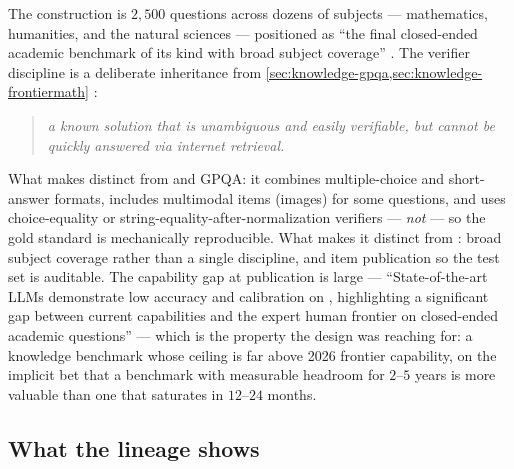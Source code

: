 The construction is $2{,}500$ questions across dozens of subjects ---
mathematics, humanities, and the natural sciences ---
positioned as ``the final closed-ended academic benchmark of its kind
with broad subject coverage'' \citep[\S{}abstract]{phan2025-hle}. The
verifier discipline is a deliberate inheritance from
\cref{sec:knowledge-gpqa,sec:knowledge-frontiermath}
\citep[\S{}sec-format]{phan2025-hle}:

\begin{quote}\itshape
a known solution that is unambiguous and easily verifiable, but cannot
be quickly answered via internet retrieval.
\end{quote}

What makes  distinct from  and GPQA: it combines multiple-choice
and short-answer formats, includes multimodal items (images) for some
questions, and uses choice-equality or string-equality-after-normalization
verifiers --- \emph{not}  --- so the gold standard is
mechanically reproducible. What makes it distinct from :
broad subject coverage rather than a single discipline, and item
publication so the test set is auditable. The capability gap at
publication is large --- ``State-of-the-art LLMs demonstrate low
accuracy and calibration on , highlighting a significant gap between
current  capabilities and the expert human frontier on closed-ended
academic questions'' \citep[\S{}sec-capability-gap]{phan2025-hle} ---
which is the property the design was reaching for: a knowledge
benchmark whose ceiling is far above 2026 frontier capability, on the
implicit bet that a benchmark with measurable headroom for $2$--$5$ years
is more valuable than one that saturates in $12$--$24$ months.

\subsection{What the lineage shows}
\label{sec:knowledge-summary}

